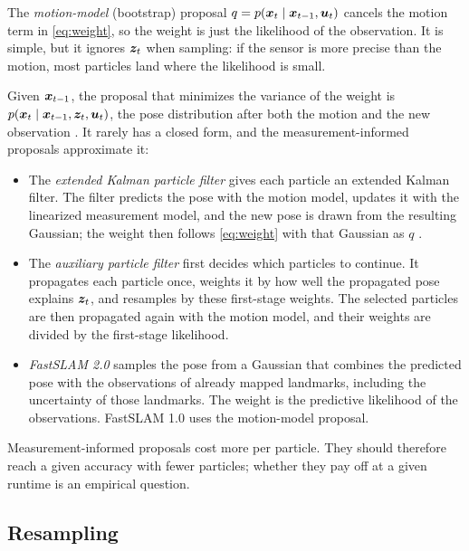 The \emph{motion-model} (bootstrap) proposal $q = p(\bm{x}_t \mid \bm{x}_{t-1}, \bm{u}_t)$ \cite{gordon1993novel} cancels the
motion term in \eqref{eq:weight}, so the weight is just the likelihood of the observation. It is simple, but it
ignores $\bm{z}_t$ when sampling: if the sensor is more precise than the motion, most particles land where the likelihood
is small.

Given $\bm{x}_{t-1}$, the proposal that minimizes the variance of the weight is $p(\bm{x}_t \mid \bm{x}_{t-1}, \bm{z}_t, \bm{u}_t)$,
the pose distribution after both the motion and the new observation \cite{doucet2011tutorial}. It rarely has a closed
form, and the measurement-informed proposals approximate it:
\begin{itemize}
  \item The \emph{extended Kalman particle filter} gives each particle an extended Kalman filter. The filter predicts
        the pose with the motion model, updates it with the linearized measurement model, and the new pose is drawn
        from the resulting Gaussian; the weight then follows \eqref{eq:weight} with that Gaussian as $q$
        \cite{elfring2021particle}.
  \item The \emph{auxiliary particle filter} \cite{pitt1999filtering} first decides which particles to continue.
        It propagates each particle once, weights it by how well the propagated pose explains $\bm{z}_t$, and resamples
        by these first-stage weights. The selected particles are then propagated again with the motion model, and
        their weights are divided by the first-stage likelihood.
  \item \emph{FastSLAM 2.0} \cite{montemerlo2003fastslam2} samples the pose from a Gaussian that combines the
        predicted pose with the observations of already mapped landmarks, including the uncertainty of those
        landmarks. The weight is the predictive likelihood of the observations. FastSLAM 1.0
        \cite{montemerlo2002fastslam} uses the motion-model proposal.
\end{itemize}
Measurement-informed proposals cost more per particle. They should therefore reach a given accuracy with fewer
particles; whether they pay off at a given runtime is an empirical question.

\subsection{Resampling}

